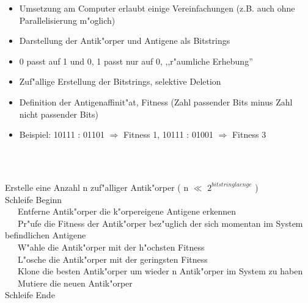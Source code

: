 \documentclass[10pt, a4]{seminar}
\begin{document}
\begin{slide}
\begin{itemize}
\item Umsetzung am Computer erlaubt einige Vereinfachungen (z.B. auch ohne Parallelisierung m"oglich)
\item Darstellung der Antik"orper und Antigene als Bitstrings
\item 0 passt auf 1 und 0, 1 passt nur auf 0, ,,r"aumliche Erhebung''
\item Zuf"allige Erstellung der Bitstrings, selektive Deletion
\item Definition der Antigenaffinit"at, Fitness (Zahl passender Bits minus Zahl nicht passender Bits)
\item Beispiel: 10111 : 01101 \(\Rightarrow\) Fitness 1, 10111 : 01001 \(\Rightarrow\) Fitness 3
\end{itemize}
\vfill
\end{slide}


\begin{slide}
\ \\
{\raggedright
\\
Erstelle eine Anzahl n zuf"alliger Antik"orper ( n \(\ll\) \(2^{bitstringlaenge}\) )\\
Schleife Beginn\\
\ \ \ Entferne Antik"orper die k"orpereigene Antigene erkennen\\
\ \ \ Pr"ufe die Fitness der Antik"orper bez"uglich der sich momentan im System befindlichen Antigene\\
\ \ \ W"ahle die Antik"orper mit der h"ochsten Fitness\\
\ \ \ L"osche die Antik"orper mit der geringsten Fitness\\
\ \ \ Klone die besten Antik"orper um wieder n Antik"orper im System zu haben\\
\ \ \ Mutiere die neuen Antik"orper\\
Schleife Ende\\
}
\vfill
\end{slide}
\end{document}
